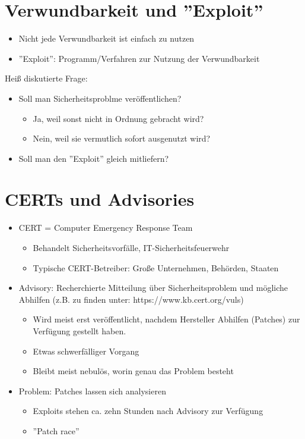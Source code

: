 \documentclass[openany]{book}
\begin{document}
\section{Verwundbarkeit und ''Exploit''}

\begin{itemize}
    \item Nicht jede Verwundbarkeit ist einfach zu nutzen
    \item ''Exploit'': Programm/Verfahren zur Nutzung der Verwundbarkeit
\end{itemize}

Heiß diskutierte Frage:
\begin{itemize}
    \item Soll man Sicherheitsproblme veröffentlichen?
    \begin{itemize}
        \item Ja, weil sonst nicht in Ordnung gebracht wird?
        \item Nein, weil sie vermutlich sofort ausgenutzt wird?
    \end{itemize}
    \item Soll man den ''Exploit'' gleich mitliefern?
\end{itemize}

\section{CERTs und Advisories}

\begin{itemize}
    \item CERT = Computer Emergency Response Team
    \begin{itemize}
        \item Behandelt Sicherheitsvorfälle, IT-Sicherheitsfeuerwehr
        \item Typische CERT-Betreiber: Große Unternehmen, Behörden, Staaten
    \end{itemize}
    \item Advisory: Recherchierte Mitteilung über Sicherheitsproblem und mögliche Abhilfen (z.B. zu finden unter:  https://www.kb.cert.org/vuls)
    \begin{itemize}
        \item Wird meist erst veröffentlicht, nachdem Hersteller Abhilfen (Patches) zur Verfügung gestellt haben.
        \item Etwas schwerfälliger Vorgang
        \item Bleibt meist nebulös, worin genau das Problem besteht
    \end{itemize}
    \item Problem: Patches lassen sich analysieren
    \begin{itemize}
        \item Exploits stehen ca. zehn Stunden nach Advisory zur Verfügung
        \item ''Patch race''
    \end{itemize}
\end{itemize}
\end{document}
